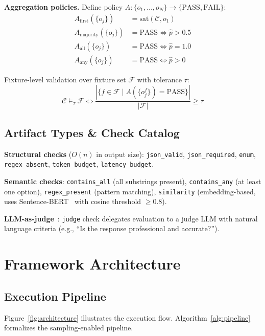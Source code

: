\documentclass[sigconf]{acmart}
\begin{document}
\textbf{Aggregation policies.} Define policy \( A: \{o_1, \ldots, o_N\} \to \{\text{PASS}, \text{FAIL}\} \):
\begin{align*}
A_{\text{first}}(\{o_j\}) &= \text{sat}(\mathcal{C}, o_1) \\
A_{\text{majority}}(\{o_j\}) &= \text{PASS} \iff \hat{p} > 0.5 \\
A_{\text{all}}(\{o_j\}) &= \text{PASS} \iff \hat{p} = 1.0 \\
A_{\text{any}}(\{o_j\}) &= \text{PASS} \iff \hat{p} > 0
\end{align*}

Fixture-level validation over fixture set \( \mathcal{F} \) with tolerance \( \tau \):
\[
\mathcal{C} \models_\tau \mathcal{F} \iff \frac{|\{f \in \mathcal{F} \mid A(\{o_j^f\}) = \text{PASS}\}|}{|\mathcal{F}|} \geq \tau
\]

\subsection{Artifact Types \& Check Catalog}

\textbf{Structural checks} (\( O(n) \) in output size): \texttt{json\_valid}, \texttt{json\_required}, \texttt{enum}, \texttt{regex\_absent}, \texttt{token\_budget}, \texttt{latency\_budget}.

\textbf{Semantic checks}: \texttt{contains\_all} (all substrings present), \texttt{contains\_any} (at least one option), \texttt{regex\_present} (pattern matching), \texttt{similarity} (embedding-based, uses Sentence-BERT~\cite{reimers2019sentencebert} with cosine threshold \( \geq 0.8 \)).

\textbf{LLM-as-judge}~\cite{zheng2023judging}: \texttt{judge} check delegates evaluation to a judge LLM with natural language criteria (e.g., ``Is the response professional and accurate?'').

\section{Framework Architecture}

\subsection{Execution Pipeline}

Figure~\ref{fig:architecture} illustrates the execution flow. Algorithm~\ref{alg:pipeline} formalizes the sampling-enabled pipeline.
\end{document}
